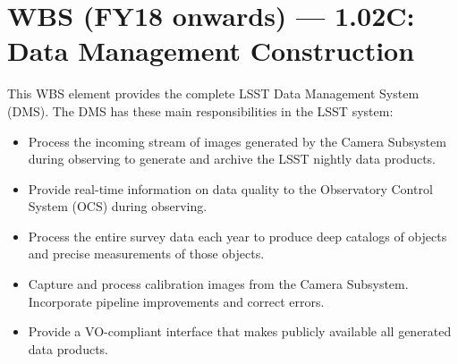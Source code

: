 \section{WBS (FY18 onwards) --- 1.02C: Data Management Construction}
\label{sec:wbslist}

This WBS element provides the complete LSST Data Management System (DMS). The
DMS has these main responsibilities in the LSST system:

\begin{itemize}

  \item{Process the incoming stream of images generated by the Camera
  Subsystem during observing to generate and archive the LSST nightly data
  products.}

  \item{Provide real-time information on data quality to the Observatory
  Control System (OCS) during observing.}

  \item{Process the entire survey data each year to produce deep catalogs of
  objects and precise measurements of those objects.}

  \item{Capture and process calibration images from the Camera Subsystem.
  Incorporate pipeline improvements and correct errors.}

  \item{Provide a VO-compliant interface that makes publicly available all
  generated data products.}

\end{itemize}
